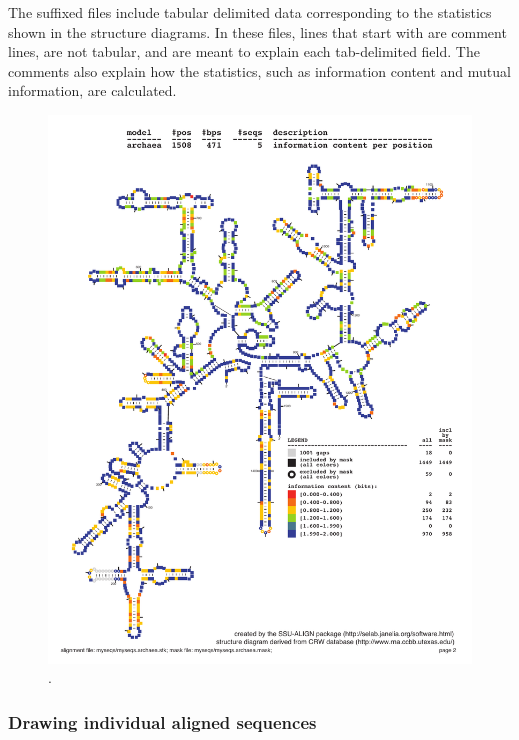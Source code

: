 The  suffixed files include tabular delimited data
corresponding to the statistics shown in the structure diagrams. In
these files, lines that start with \prog{\#} are comment lines, are
not tabular, and are meant to explain each tab-delimited field. The
comments also explain how the statistics, such as information content
and mutual information, are calculated.

\begin{figure}
  \begin{center}
\includegraphics[width=6.5in]{Figures/myseqs-archaea-info}
        \caption[Information content per consensus position of the
          archaeal alignment created in the tutorial].
  \end{center}
\label{fig:myseqs-archaea-info}
\end{figure}

\subsubsection{Drawing individual aligned sequences}

